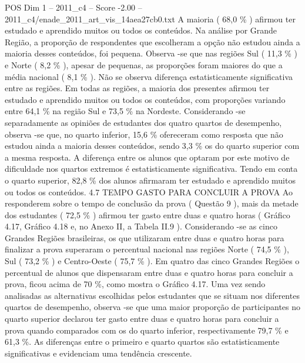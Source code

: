 \begin{textsample}{POS Dim 1 – 2011\_c4 – Score -2.00 – 2011\_c4/enade\_2011\_art\_vis\_14aea27cb0.txt}
A maioria ( 68,0 \% ) afirmou ter estudado e aprendido muitos ou todos os conteúdos.
Na análise por Grande Região, a proporção de respondentes que escolheram a opção não estudou ainda a maioria desses conteúdos, foi pequena.
Observa -se que nas regiões Sul ( 11,3 \% ) e Norte ( 8,2 \% ), apesar de pequenas, as proporções foram maiores do que a média nacional ( 8,1 \% ).
Não se observa diferença estatisticamente significativa entre as regiões.
Em todas as regiões, a maioria dos presentes afirmou ter estudado e aprendido muitos ou todos os conteúdos, com proporções variando entre 64,1 \% na região Sul e 73,5 \% na Nordeste.
Considerando -se separadamente as opiniões de estudantes dos quatro quartos de desempenho, observa -se que, no quarto inferior, 15,6 \% ofereceram como resposta que não estudou ainda a maioria desses conteúdos, sendo 3,3 \% os do quarto superior com a mesma resposta.
A diferença entre os alunos que optaram por este motivo de dificuldade nos quartos extremos é estatisticamente significativa.
Tendo em conta o quarto superior, 82,8 \% dos alunos afirmaram ter estudado e aprendido muitos ou todos os conteúdos. 4.7 TEMPO GASTO PARA CONCLUIR A PROVA Ao responderem sobre o tempo de conclusão da prova ( Questão 9 ), mais da metade dos estudantes ( 72,5 \% ) afirmou ter gasto entre duas e quatro horas ( Gráfico 4.17, Gráfico 4.18 e, no Anexo II, a Tabela II.9 ).
Considerando -se as cinco Grandes Regiões brasileiras, os que utilizaram entre duas e quatro horas para finalizar a prova superaram o percentual nacional nas regiões Norte ( 74,5 \% ), Sul ( 73,2 \% ) e Centro-Oeste ( 75,7 \% ).
Em quatro das cinco Grandes Regiões o percentual de alunos que dispensaram entre duas e quatro horas para concluir a prova, ficou acima de 70 \%, como mostra o Gráfico 4.17.
Uma vez sendo analisadas as alternativas escolhidas pelos estudantes que se situam nos diferentes quartos de desempenho, observa -se que uma maior proporção de participantes no quarto superior declarou ter gasto entre duas e quatro horas para concluir a prova quando comparados com os do quarto inferior, respectivamente 79,7 \% e 61,3 \%.
As diferenças entre o primeiro e quarto quartos são estatisticamente significativas e evidenciam uma tendência crescente.

\end{textsample}
